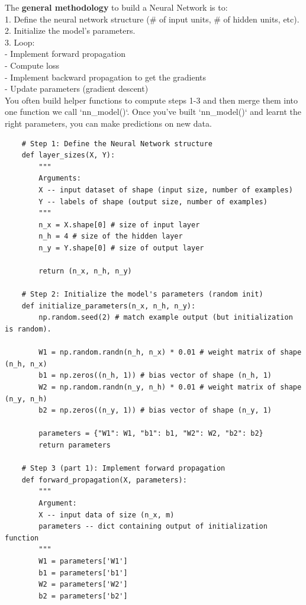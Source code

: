 \documentclass[11pt, a4paper]{article}
\begin{document}
\begin{spacing}{1.1}
	\noindent The \textbf{general methodology} to build a Neural Network is to: \\
	\hspace*{3mm} 1. Define the neural network structure (\# of input units,  \# of hidden units, etc). \\
	\hspace*{3mm} 2. Initialize the model's parameters. \\
	\hspace*{3mm} 3. Loop: \\
	\hspace*{7mm} - Implement forward propagation \\
	\hspace*{7mm} - Compute loss \\
	\hspace*{7mm} - Implement backward propagation to get the gradients \\
	\hspace*{7mm} - Update parameters (gradient descent) \vspace*{1mm} \\
	You often build helper functions to compute steps 1-3 and then merge them into one function we call `nn\_model()`. Once you've built `nn\_model()` and learnt the right parameters, you can make predictions on new data.
	\begin{lstlisting}
	# Step 1: Define the Neural Network structure
	def layer_sizes(X, Y):
		"""
		Arguments:
		X -- input dataset of shape (input size, number of examples)
		Y -- labels of shape (output size, number of examples)
		"""
		n_x = X.shape[0] # size of input layer
		n_h = 4 # size of the hidden layer
		n_y = Y.shape[0] # size of output layer

		return (n_x, n_h, n_y)

	# Step 2: Initialize the model's parameters (random init)
	def initialize_parameters(n_x, n_h, n_y):
		np.random.seed(2) # match example output (but initialization is random). 
		
		W1 = np.random.randn(n_h, n_x) * 0.01 # weight matrix of shape (n_h, n_x)
		b1 = np.zeros((n_h, 1)) # bias vector of shape (n_h, 1)
		W2 = np.random.randn(n_y, n_h) * 0.01 # weight matrix of shape (n_y, n_h)
		b2 = np.zeros((n_y, 1)) # bias vector of shape (n_y, 1)

		parameters = {"W1": W1, "b1": b1, "W2": W2, "b2": b2}
		return parameters 
		
	# Step 3 (part 1): Implement forward propagation
	def forward_propagation(X, parameters):
		"""
		Argument:
		X -- input data of size (n_x, m)
		parameters -- dict containing output of initialization function
		"""
		W1 = parameters['W1']
		b1 = parameters['b1']
		W2 = parameters['W2']
		b2 = parameters['b2']
		

\end{lstlisting}
\end{spacing}
\end{document}
